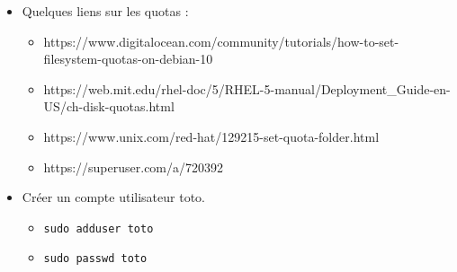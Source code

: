 \documentclass[a4paper]{article}
\begin{document}
\begin{itemize}

\item Quelques liens sur les quotas :
\begin{itemize}
    \item https://www.digitalocean.com/community/tutorials/how-to-set-filesystem-quotas-on-debian-10
    \item https://web.mit.edu/rhel-doc/5/RHEL-5-manual/Deployment\_Guide-en-US/ch-disk-quotas.html
    \item https://www.unix.com/red-hat/129215-set-quota-folder.html
    \item https://superuser.com/a/720392
\end{itemize}

\item Créer un compte utilisateur toto.
\begin{example}
    \begin{itemize}
        \item \texttt{sudo adduser toto}
        \item \texttt{sudo passwd toto}
    \end{itemize}
\end{example}


\end{itemize}
\end{document}
